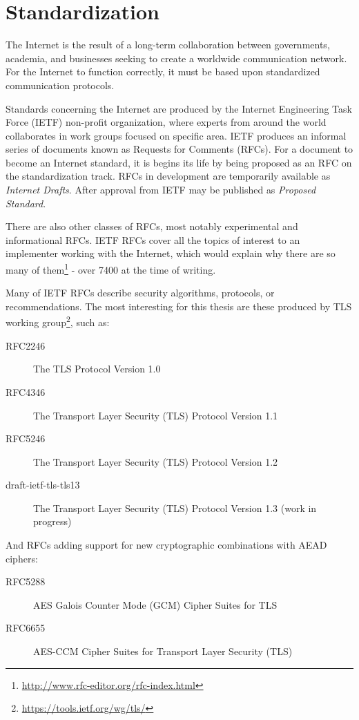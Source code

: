 \section{Standardization}

The Internet is the result of a long-term collaboration between governments, academia, and businesses seeking to create a worldwide communication network. For the Internet to function correctly, it must be based upon standardized communication protocols.

Standards concerning the Internet are produced by the Internet Engineering Task Force (IETF) non-profit organization, where experts from around the world collaborates in work groups focused on specific area. IETF produces an informal series of documents known as Requests for Comments (RFCs). For a document to become an Internet standard, it is begins its life by being proposed as an RFC on the standardization track. RFCs in development are temporarily available as \textit{Internet Drafts}. After approval from IETF may be published as \textit{Proposed Standard}. \cite[p.~15]{dent2004user}

There are also other classes of RFCs, most notably experimental and informational RFCs. IETF RFCs cover all the topics of interest to an implementer working with the Internet, which would explain why there are so many of them\footnote{\url{http://www.rfc-editor.org/rfc-index.html}} - over 7400 at the time of writing.

Many of IETF RFCs describe security algorithms, protocols, or recommendations. The most interesting for this thesis are these produced by TLS working group\footnote{\url{https://tools.ietf.org/wg/tls/}}, such as:

\begin{description}
  \item[RFC2246] The TLS Protocol Version 1.0
  \item[RFC4346] The Transport Layer Security (TLS) Protocol Version 1.1
  \item[RFC5246] The Transport Layer Security (TLS) Protocol Version 1.2
  \item[draft-ietf-tls-tls13] The Transport Layer Security (TLS) Protocol Version 1.3 (work in progress)
\end{description}

And RFCs adding support for new cryptographic combinations with AEAD ciphers:

\begin{description}
  \item[RFC5288] AES Galois Counter Mode (GCM) Cipher Suites for TLS
  \item[RFC6655] AES-CCM Cipher Suites for Transport Layer Security (TLS)
\end{description}

